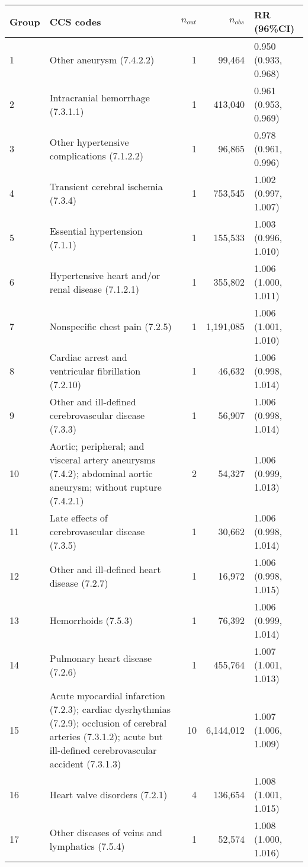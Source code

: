\begin{tabular}{lp{6.5cm}rrp{2.2cm}}
  \hline
Group & CCS codes & $n_{out}$ & $n_{obs}$ & RR (96\%CI) \\ 
  \hline
   1 & Other aneurysm (7.4.2.2) &    1 & 99,464 & 0.950 (0.933, 0.968) \\ 
     2 & Intracranial hemorrhage (7.3.1.1) &    1 & 413,040 & 0.961 (0.953, 0.969) \\ 
     3 & Other hypertensive complications (7.1.2.2) &    1 & 96,865 & 0.978 (0.961, 0.996) \\ 
     4 & Transient cerebral ischemia (7.3.4) &    1 & 753,545 & 1.002 (0.997, 1.007) \\ 
     5 & Essential hypertension (7.1.1) &    1 & 155,533 & 1.003 (0.996, 1.010) \\ 
     6 & Hypertensive heart and/or renal disease (7.1.2.1) &    1 & 355,802 & 1.006 (1.000, 1.011) \\ 
     7 & Nonspecific chest pain (7.2.5) &    1 & 1,191,085 & 1.006 (1.001, 1.010) \\ 
     8 & Cardiac arrest and ventricular fibrillation (7.2.10) &    1 & 46,632 & 1.006 (0.998, 1.014) \\ 
     9 & Other and ill-defined cerebrovascular disease (7.3.3) &    1 & 56,907 & 1.006 (0.998, 1.014) \\ 
    10 & Aortic; peripheral; and visceral artery aneurysms (7.4.2); abdominal aortic aneurysm; without rupture (7.4.2.1) &    2 & 54,327 & 1.006 (0.999, 1.013) \\ 
    11 & Late effects of cerebrovascular disease (7.3.5) &    1 & 30,662 & 1.006 (0.998, 1.014) \\ 
    12 & Other and ill-defined heart disease (7.2.7) &    1 & 16,972 & 1.006 (0.998, 1.015) \\ 
    13 & Hemorrhoids (7.5.3) &    1 & 76,392 & 1.006 (0.999, 1.014) \\ 
    14 & Pulmonary heart disease (7.2.6) &    1 & 455,764 & 1.007 (1.001, 1.013) \\ 
    15 & Acute myocardial infarction (7.2.3); cardiac dysrhythmias (7.2.9); occlusion of cerebral arteries (7.3.1.2); acute but ill-defined cerebrovascular accident (7.3.1.3) &   10 & 6,144,012 & 1.007 (1.006, 1.009) \\ 
    16 & Heart valve disorders (7.2.1) &    4 & 136,654 & 1.008 (1.001, 1.015) \\ 
    17 & Other diseases of veins and lymphatics (7.5.4) &    1 & 52,574 & 1.008 (1.000, 1.016) \\ 

\end{tabular}
